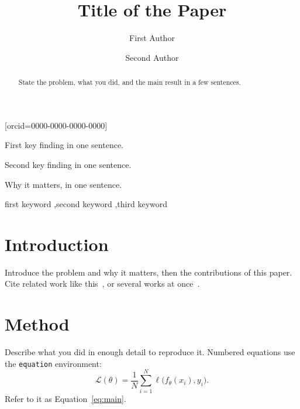 \documentclass[a4paper,fleqn]{cas-dc}
\begin{document}
\title[mode=title]{Title of the Paper}

\author[1]{First Author}[orcid=0000-0000-0000-0000]
\cormark[1]

\author[2]{Second Author}



\begin{abstract}
State the problem, what you did, and the main result in a few sentences.
\end{abstract}

\begin{highlights}
\item First key finding in one sentence.
\item Second key finding in one sentence.
\item Why it matters, in one sentence.
\end{highlights}

\begin{keywords}
first keyword \sep second keyword \sep third keyword
\end{keywords}

\maketitle

\section{Introduction}
\label{sec:intro}
Introduce the problem and why it matters, then the contributions of this
paper. Cite related work like this~\cite{zienkiewicz2005}, or several works at
once~\cite{zienkiewicz2005,timoshenko1959}.

\section{Method}
\label{sec:method}
Describe what you did in enough detail to reproduce it. Numbered equations use
the \texttt{equation} environment:
\begin{equation}
  \label{eq:main}
  \mathcal{L}(\theta) = \frac{1}{N} \sum_{i=1}^{N} \ell\bigl(f_\theta(x_i), y_i\bigr).
\end{equation}
Refer to it as Equation~\eqref{eq:main}.
\end{document}
